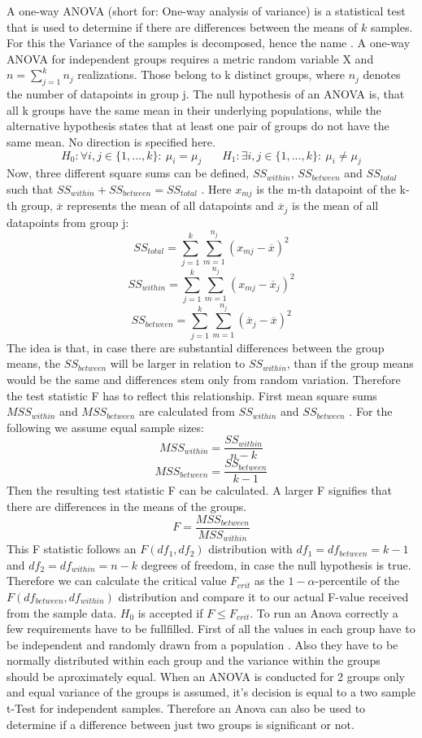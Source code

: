 \documentclass[12 pt]{scrartcl}
\begin{document}
A one-way ANOVA (short for: One-way analysis of variance) is a statistical test that is used to determine if there are differences between the means of $k$ samples.
For this the Variance of the samples is decomposed, hence the name \citep[p.~392]{eid2017statistik}.
A one-way ANOVA for independent groups requires a metric random variable X and $n = \sum^{k}_{j=1} n_{j}$ realizations. Those belong to k distinct groups, where $n_{j}$ denotes the number of datapoints in group j. The null hypothesis of an ANOVA is, that all k groups have the same mean in their underlying populations, while the alternative hypothesis states that at least one pair of groups do not have the same mean. No direction is specified here.
\[ H_0: \forall i,j \in \{1,...,k\}: \ \mu_{i} = \mu_{j}  \ \ \ \ \ \ \ \   H_1: \exists i,j \in \{1,...,k\}: \ \mu_{i} \neq \mu_{j}  \]
Now, three different square sums can be defined, $SS_{within}$, $SS_{between}$ and $SS_{total}$ such that $SS_{within} + SS_{between} = SS_{total}$ \citep[p.~397]{eid2017statistik}. Here $x_{mj}$ is the m-th datapoint of the k-th group, $\overline{x}$ represents the mean of all datapoints and $\overline{x}_j$ is the mean of all datapoints from group j:
\[ SS_{total} = \sum^{k}_{j=1} \sum^{n_j}_{m=1} ( x_{mj} - \overline{x} )^2 \]
\[ SS_{within} = \sum^{k}_{j=1} \sum^{n_j}_{m=1} ( x_{mj} - \overline{x}_j )^2 \]
\[ SS_{between} = \sum^{k}_{j=1} \sum^{n_j}_{m=1} ( \overline{x}_j - \overline{x} )^2 \]
The idea is that, in case there are substantial differences between the group means, the $SS_{between}$ will be larger in relation to $SS_{within}$, than if the group means would be the same and differences stem only from random variation. Therefore the test statistic F has to reflect this relationship. First mean square sums $MSS_{within}$ and $MSS_{between}$ are calculated from $SS_{within}$ and $SS_{between}$ \citep[p.~397]{eid2017statistik}. For the following we assume equal sample sizes:
\[ MSS_{within} = \frac{SS_{within}}{n-k} \]
\[ MSS_{between} = \frac{SS_{between}}{k-1} \]
Then the resulting test statistic F can be calculated. A larger F signifies that there are differences in the means of the groups.
\[ F = \frac{MSS_{between}}{MSS_{within}} \]
This F statistic follows an $F(df_{1},df_{2})$ distribution with $df_{1} = df_{between} = k-1$ and $df_{2} = df_{within} = n - k$ degrees of freedom, in case the null hypothesis is true.
Therefore we can calculate the critical value $F_{crit}$ as the $1-\alpha$-percentile of the $F(df_{between},df_{within})$ distribution and compare it to our actual F-value received from the sample data. $H_0$ is accepted if $F \leq F_{crit}$.
To run an Anova correctly a few requirements have to be fullfilled.
First of all the values in each group have to be independent and randomly drawn from a population \citep[p.~401]{eid2017statistik}. Also they have to be normally distributed within each group and the variance within the groups should be aproximately equal.
When an ANOVA is conducted for 2 groups only and equal variance of the groups is assumed, it's decision is equal to a two sample t-Test for independent samples. Therefore an Anova can also be used to determine if a difference between just two groups is significant or not.
\end{document}
